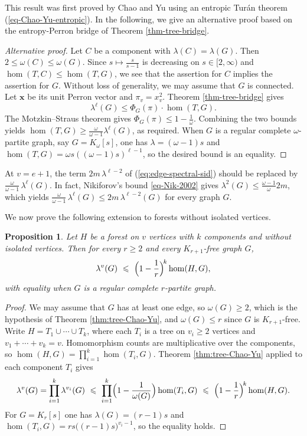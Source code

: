 \documentclass[11pt, a4paper]{article}
\newtheorem{proposition}[theorem]{Proposition}
\theoremstyle{definition}
\theoremstyle{plain}
\renewcommand{\le}{\leqslant}
\renewcommand{\ge}{\geqslant}
\begin{document}
This result was first proved by Chao and Yu \cite{CY2026} using an entropic Tur\'{a}n theorem (\ref{eq-Chao-Yu-entropic}). In the following, we give an alternative proof based on the entropy-Perron bridge of Theorem \ref{thm-tree-bridge}. 



\begin{proof}[Alternative proof]
Let $C$ be a component with $\lambda (C)=\lambda (G)$. 
Then  $2\le \omega (C)\le \omega (G)$. Since $s\mapsto \frac{s}{s-1}$ is decreasing on
$s\in [2,\infty )$ and $\hom (T,C)\le \hom (T,G)$, we see that the assertion for $C$ implies
the assertion for $G$. 
Without loss of generality, 
we may assume that $G$ is connected. 
Let $\bm{x}$ be its unit Perron vector and $\pi_v=x_v^2$. Theorem  \ref{thm-tree-bridge} gives
$$\lambda^{\ell}(G)\le \Phi_G(\pi ) \cdot \hom (T,G).$$ 
The Motzkin--Straus theorem gives
$\Phi_G(\pi )\le 1-\frac{1}{\omega}.$ 
Combining the two bounds yields
$\hom (T,G)\ge \frac{\omega}{\omega -1}\lambda^{\ell}(G)$, as
required.  
When $G$ is a regular complete $\omega$-partite graph, say  $G=K_{\omega}[s]$, one has $\lambda =(\omega -1)s$
and $\hom (T,G) =\omega s ((\omega -1)s )^{\ell -1}$, so
the desired bound is an equality.
\end{proof}


At $v=e+1$, the term  $2m\,\lambda^{\ell-2}$ of (\ref{eq:edge-spectral-sid}) should be replaced by $\frac{\omega }{\omega -1}\,
  \lambda^{\ell}(G)$.   
In fact,  Nikiforov's bound \eqref{eq-Nik-2002} gives
$\lambda^2(G)\le \frac{\omega-1}{\omega }2m$, which yields  $  \frac{\omega }{\omega -1}\,
  \lambda^{\ell}(G) \le 2m\,\lambda^{\ell -2}(G)$ 
for every graph $G$. 


\smallskip 
We now prove the following extension to forests without isolated vertices. 

\begin{proposition} 
\label{prop:forest-conj}
Let $H$ be a forest on $v$ vertices with $k$ components and without
isolated vertices. Then for every $r\ge 2$ and every $K_{r+1}$-free
graph $G$,
\[
  \lambda^{v}(G) \ \le\
  \Bigl(1-\frac1r\Bigr)^{\! k} \hom (H,G),
\]
with equality when $G$ is a regular complete $r$-partite graph.
\end{proposition}

\begin{proof}
We may assume that $G$ has at least one edge, so 
 $\omega (G)\ge 2$, which is
the hypothesis of Theorem \ref{thm:tree-Chao-Yu}, and
$\omega (G)\le r$ since $G$ is $K_{r+1}$-free. 
Write $H=T_1\cup \cdots \cup T_k$, where each $T_i$ is a tree on $v_i\ge 2$ vertices and $v_1+\cdots +v_k =v$. Homomorphism counts are
multiplicative over the components, so
$\hom (H,G)=\prod_{i=1}^{k}\hom (T_i,G)$. 
Theorem \ref{thm:tree-Chao-Yu} applied to each component $T_i$ gives
\[
  \lambda^{v}(G)=\prod_{i=1}^{k}\lambda^{v_i}(G)
  \ \le\ \prod_{i=1}^{k}\Bigl(1-\frac{1}{\omega (G)}\Bigr)\hom (T_i,G)
  \ \le\ \Bigl(1-\frac1r\Bigr)^{\! k}\hom (H,G).
\]
For $G=K_r[s]$ one has $\lambda (G)=(r-1)s$ and
$\hom (T_i,G)=rs\bigl((r-1)s\bigr)^{v_i-1}$, so 
the equality holds.
\end{proof} 
\end{document}

